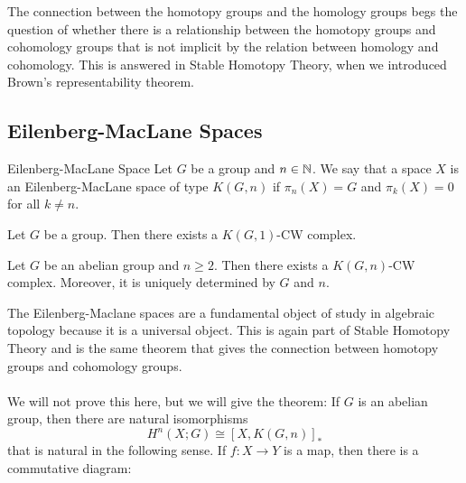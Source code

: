 \documentclass[a4paper]{article}
\begin{document}
The connection between the homotopy groups and the homology groups begs the question of whether there is a relationship between the homotopy groups and cohomology groups that is not implicit by the relation between homology and cohomology. This is answered in Stable Homotopy Theory, when we introduced Brown's representability theorem. 

\subsection{Eilenberg-MacLane Spaces}
\begin{defn}{Eilenberg-MacLane Space}{} Let $G$ be a group and $n\in\mathbb{N}$. We say that a space $X$ is an Eilenberg-MacLane space of type $K(G,n)$ if $\pi_n(X)=G$ and $\pi_k(X)=0$ for all $k\neq n$. 
\end{defn}

\begin{prp}{}{} Let $G$ be a group. Then there exists a $K(G,1)$-CW complex. 
\end{prp}

\begin{thm}{}{} Let $G$ be an abelian group and $n\geq 2$. Then there exists a $K(G,n)$-CW complex. Moreover, it is uniquely determined by $G$ and $n$. 
\end{thm}

The Eilenberg-Maclane spaces are a fundamental object of study in algebraic topology because it is a universal object. This is again part of Stable Homotopy Theory and is the same theorem that gives the connection between homotopy groups and cohomology groups. \\~\\

We will not prove this here, but we will give the theorem: If $G$ is an abelian group, then there are natural isomorphisms $$H^n(X;G)\cong[X,K(G,n)]_\ast$$ that is natural in the following sense. If $f:X\to Y$ is a map, then there is a commutative diagram: \\~\\
\\~\\
\end{document}
